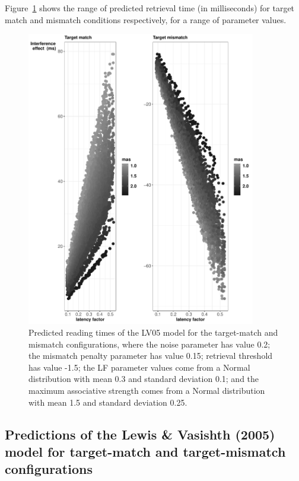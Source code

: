 \documentclass{cambridge7A}\usepackage[]{graphicx}\usepackage[]{color}
\begin{document}
Figure~\ref{fig:plotmatch} shows the range of predicted retrieval time (in milliseconds) for target match and mismatch conditions respectively, for a range of parameter values. 





\begin{figure}[!htbp]
\centering
\includegraphics[width=10cm]{figures/priorpredictions}
\caption{Predicted reading times of the LV05 model for the target-match and mismatch configurations, where the noise parameter has value 0.2; the mismatch penalty parameter has value 0.15; retrieval threshold has value -1.5;  the LF parameter values come from a Normal distribution with mean 0.3 and standard deviation 0.1; and the maximum associative strength comes from a Normal distribution with mean 1.5 and standard deviation 0.25.}\label{fig:plotmatch}
\end{figure}

\subsection{Predictions of the Lewis \& Vasishth (2005) model for target-match and target-mismatch configurations} \label{core03predictions}
\end{document}
